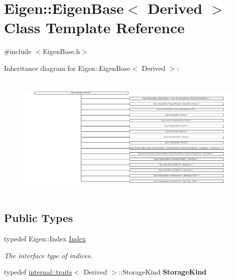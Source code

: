 \hypertarget{struct_eigen_1_1_eigen_base}{}\section{Eigen\+::Eigen\+Base$<$ Derived $>$ Class Template Reference}
\label{struct_eigen_1_1_eigen_base}


{\ttfamily \#include $<$Eigen\+Base.\+h$>$}

Inheritance diagram for Eigen\+::Eigen\+Base$<$ Derived $>$\+:\begin{figure}[H]
\begin{center}
\leavevmode
\includegraphics[height=6.079183cm]{struct_eigen_1_1_eigen_base}
\end{center}
\end{figure}
\subsection*{Public Types}
\begin{DoxyCompactItemize}
\item 
typedef Eigen\+::\+Index \mbox{\hyperlink{struct_eigen_1_1_eigen_base_a554f30542cc2316add4b1ea0a492ff02}{Index}}
\begin{DoxyCompactList}\small\item\em The interface type of indices. \end{DoxyCompactList}\item 
\mbox{\label{struct_eigen_1_1_eigen_base_a95ff992a5c4c5debb41f6ae2f639e1f3}} 
typedef \mbox{\hyperlink{struct_eigen_1_1internal_1_1traits}{internal\+::traits}}$<$ Derived $>$\+::Storage\+Kind {\bfseries Storage\+Kind}
\end{DoxyCompactItemize}
